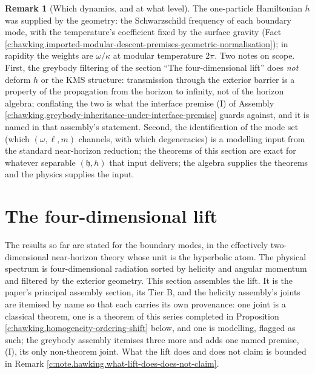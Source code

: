 \documentclass[11pt]{article}
\theoremstyle{definition}
\newtheorem{remark}[theorem]{Remark}
\theoremstyle{plain}
\begin{document}
\begin{remark}[Which dynamics, and at what level]\label{c:note.hawking.which-dynamics-what-level}
The one-particle Hamiltonian $h$ was supplied by the geometry: the Schwarzschild frequency of each boundary mode, with the temperature's coefficient fixed by the surface gravity (Fact \ref{c:hawking.imported-modular-descent-premises-geometric-normalisation}); in rapidity the weights are $\omega/\kappa$ at modular temperature $2\pi$. Two notes on scope. First, the greybody filtering of the section ``The four-dimensional lift'' does \emph{not} deform $h$ or the KMS structure: transmission through the exterior barrier is a property of the propagation from the horizon to infinity, not of the horizon algebra; conflating the two is what the interface premise (I) of Assembly \ref{c:hawking.greybody-inheritance-under-interface-premise} guards against, and it is named in that assembly's statement. Second, the identification of the mode set (which $(\omega, \ell, m)$ channels, with which degeneracies) is a modelling input from the standard near-horizon reduction; the theorems of this section are exact for whatever separable $(\mathfrak{h}, h)$ that input delivers; the algebra supplies the theorems and the physics supplies the input.
\end{remark}

\section{The four-dimensional lift}

\label{c:note.hawking.setting-four-dimensional-lift}
The results so far are stated for the boundary modes, in the effectively two-dimensional near-horizon theory whose unit is the hyperbolic atom. The physical spectrum is four-dimensional radiation sorted by helicity and angular momentum and filtered by the exterior geometry. This section assembles the lift. It is the paper's principal assembly section, its Tier B, and the helicity assembly's joints are itemised by name so that each carries its own provenance: one joint is a classical theorem, one is a theorem of this series completed in Proposition \ref{c:hawking.homogeneity-ordering-shift} below, and one is modelling, flagged as such; the greybody assembly itemises three more and adds one named premise, (I), its only non-theorem joint. What the lift does and does not claim is bounded in Remark \ref{c:note.hawking.what-lift-does-does-not-claim}.
\end{document}
